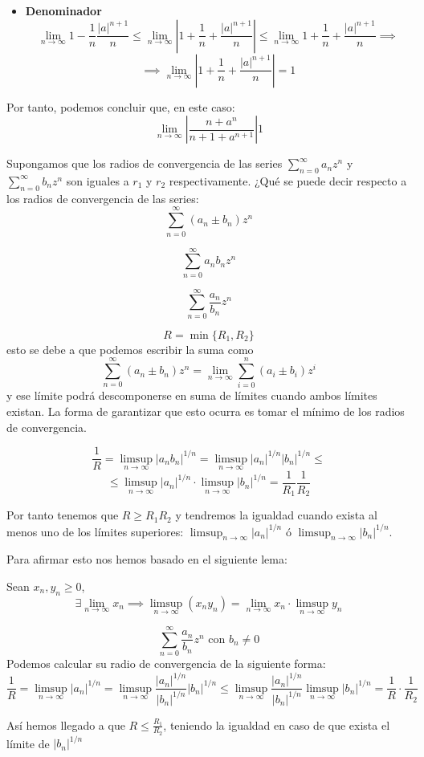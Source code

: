 \begin{problem}[12]
\begin{enumerate}
\begin{itemize}
\item \textbf{Denominador}
\[\lim_{n\to \infty}1-\frac{1}{n}\frac{|a|^{n+1}}{n} \leq \lim_{n\to \infty}\left| 1 + \frac{1}{n} + \frac{|a|^{n+1}}{n} \right| \leq \lim_{n\to \infty}1 + \frac{1}{n}+\frac{|a|^{n+1}}{n} \implies\]
\[\implies \lim_{n\to \infty}\left| 1 + \frac{1}{n} + \frac{|a|^{n+1}}{n} \right|  = 1\]
\end{itemize}
Por tanto, podemos concluir que, en este caso:
\[\lim_{n\to \infty}\left| \frac{n+a^n}{n+1+a^{n+1}}\right| 1 \]
\end{enumerate}

\end{problem}

\begin{problem}[13]
Supongamos que los radios de convergencia de las series $\sum_{n=0}^{\infty} a_nz^n$ y $\sum_{n=0}^{\infty}b_nz^n$ son iguales a $r_1$ y $r_2$ respectivamente. ¿Qué se puede decir respecto a los radios de convergencia de las series:
\ppart
\[\sum_{n=0}^{\infty} (a_n\pm b_n)z^n\]

\ppart
\[\sum_{n=0}^{\infty}a_nb_nz^n\]

\ppart
\[\sum_{n=0}^{\infty}\frac{a_n}{b_n}z^n\]

\solution

\spart
\[ R = \min\{R_1, R_2\}\]
esto se debe a que podemos escribir la suma como
\[\sum_{n=0}^{\infty}(a_n\pm b_n)z^n = \lim_{n \to \infty} \sum_{i=0}^n (a_i\pm b_i)z^i\]
y ese límite podrá descomponerse en suma de límites cuando ambos límites existan. La forma de garantizar que esto ocurra es tomar el mínimo de los radios de convergencia.

\spart
\[\frac{1}{R}=\limsup_{ n \to \infty}|a_nb_n|^{1/n} = \limsup_{n\to \infty}|a_n|^{1/n}|b_n|^{1/n} \leq\]
\[\leq \limsup_{n\to \infty} |a_n|^{1/n}\cdot \limsup_{n\to \infty} |b_n|^{1/n} = \frac{1}{R_1}\frac{1}{R_2}\]

Por tanto tenemos que $R \geq R_1R_2$ y tendremos la igualdad cuando exista al menos uno de los límites superiores: $\limsup_{n\to \infty} |a_n|^{1/n}$ ó $\limsup_{n\to \infty}|b_n|^{1/n}$.

Para afirmar esto nos hemos basado en el siguiente lema:
\begin{lemma}
Sean $x_n,y_n \geq 0$,
\[\exists \lim_{n \to \infty} x_n \implies \limsup_{n \to \infty }(x_ny_n)=\lim_{n \to \infty}x_n \cdot \limsup_{n \to \infty} y_n\]
\end{lemma}

\spart
\[\sum_{n = 0}^{\infty} \frac{a_n}{b_n}z^n \text{ con } b_n \neq 0\]
Podemos calcular su radio de convergencia de la siguiente forma:
\[\frac{1}{R}=\limsup_{n \to \infty} |a_n|^{1/n} = \limsup_{n \to \infty} \frac{|a_n|^{1/n}}{|b_n|^{1/n}}|b_n|^{1/n} \leq \limsup_{n \to \infty} \frac{|a_n|^{1/n}}{|b_n|^{1/n}}\limsup_{n \to \infty} |b_n|^{1/n}=\frac{1}{R}\cdot \frac{1}{R_2}\]

Así hemos llegado a que $R \leq \frac{R_1}{R_2}$, teniendo la igualdad en caso de que exista el límite de $|b_n|^{1/n}$


\end{problem}


